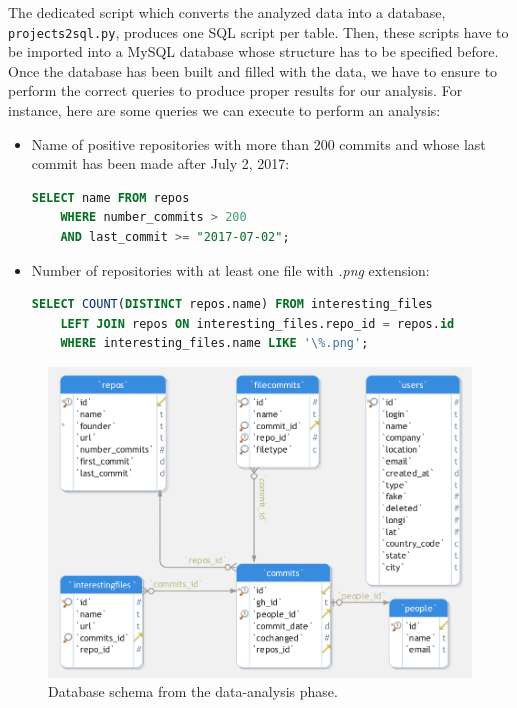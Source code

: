 \documentclass[a4paper, 12pt]{book}
\begin{document}
The dedicated script which converts the analyzed data into a database, \texttt{projects2sql.py}, produces one SQL script
per table. Then, these scripts have to be imported into a MySQL database whose structure has to be specified before.
Once the database has been built and filled with the data, we have to ensure to perform the correct queries
to produce proper results for our analysis. For instance, here are some queries we can execute to perform an analysis:
\begin{itemize}
    \item Name of positive repositories with more than 200 commits and whose last commit has been made after July 2, 2017:
    \begin{lstlisting}[language=SQL]
    SELECT name FROM repos
    WHERE number_commits > 200
    AND last_commit >= "2017-07-02"; \end{lstlisting}
    \item Number of repositories with at least one file with \textit{.png} extension:
    \begin{lstlisting}[language=SQL]
    SELECT COUNT(DISTINCT repos.name) FROM interesting_files
    LEFT JOIN repos ON interesting_files.repo_id = repos.id
    WHERE interesting_files.name LIKE '\%.png'; \end{lstlisting}
\end{itemize}

\begin{figure}
  \centering
  \includegraphics[width=15cm, keepaspectratio]{img/dbschema-generic}
  \caption{Database schema from the data-analysis phase.}
  \label{fig:dbschema}
\end{figure}
\cleardoublepage
\end{document}
